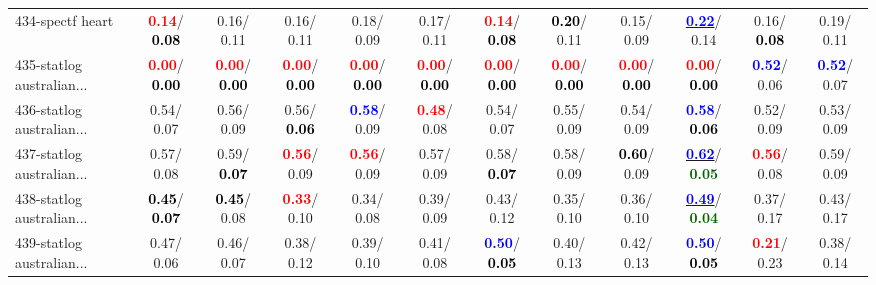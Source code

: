 \begin{table}[h]
\begin{center}
{\begin{tabular}{lc|c|c|c|c|c|c|c|c|c|c}
434-spectf heart & \textcolor{red}{\textbf{  0.14}}/\textcolor{black}{\textbf{  0.08}} &   0.16/  0.11 &   0.16/  0.11 &   0.18/  0.09 &   0.17/  0.11 & \textcolor{red}{\textbf{  0.14}}/\textcolor{black}{\textbf{  0.08}} & \textcolor{black}{\textbf{  0.20}}/  0.11 &   0.15/  0.09 & \underline{\textcolor{blue}{\textbf{  0.22}}}/  0.14 &   0.16/\textcolor{black}{\textbf{  0.08}} &   0.19/  0.11 \\
435-statlog australian... & \textcolor{red}{\textbf{  0.00}}/\textcolor{black}{\textbf{  0.00}} & \textcolor{red}{\textbf{  0.00}}/\textcolor{black}{\textbf{  0.00}} & \textcolor{red}{\textbf{  0.00}}/\textcolor{black}{\textbf{  0.00}} & \textcolor{red}{\textbf{  0.00}}/\textcolor{black}{\textbf{  0.00}} & \textcolor{red}{\textbf{  0.00}}/\textcolor{black}{\textbf{  0.00}} & \textcolor{red}{\textbf{  0.00}}/\textcolor{black}{\textbf{  0.00}} & \textcolor{red}{\textbf{  0.00}}/\textcolor{black}{\textbf{  0.00}} & \textcolor{red}{\textbf{  0.00}}/\textcolor{black}{\textbf{  0.00}} & \textcolor{red}{\textbf{  0.00}}/\textcolor{black}{\textbf{  0.00}} & \textcolor{blue}{\textbf{  0.52}}/  0.06 & \textcolor{blue}{\textbf{  0.52}}/  0.07 \\
436-statlog australian... &   0.54/  0.07 &   0.56/  0.09 &   0.56/\textcolor{black}{\textbf{  0.06}} & \textcolor{blue}{\textbf{  0.58}}/  0.09 & \textcolor{red}{\textbf{  0.48}}/  0.08 &   0.54/  0.07 &   0.55/  0.09 &   0.54/  0.09 & \textcolor{blue}{\textbf{  0.58}}/\textcolor{black}{\textbf{  0.06}} &   0.52/  0.09 &   0.53/  0.09 \\
437-statlog australian... &   0.57/  0.08 &   0.59/\textcolor{black}{\textbf{  0.07}} & \textcolor{red}{\textbf{  0.56}}/  0.09 & \textcolor{red}{\textbf{  0.56}}/  0.09 &   0.57/  0.09 &   0.58/\textcolor{black}{\textbf{  0.07}} &   0.58/  0.09 & \textcolor{black}{\textbf{  0.60}}/  0.09 & \underline{\textcolor{blue}{\textbf{  0.62}}}/\textcolor{darkgreen}{\textbf{  0.05}} & \textcolor{red}{\textbf{  0.56}}/  0.08 &   0.59/  0.09 \\ \hline
438-statlog australian... & \textcolor{black}{\textbf{  0.45}}/\textcolor{black}{\textbf{  0.07}} & \textcolor{black}{\textbf{  0.45}}/  0.08 & \textcolor{red}{\textbf{  0.33}}/  0.10 &   0.34/  0.08 &   0.39/  0.09 &   0.43/  0.12 &   0.35/  0.10 &   0.36/  0.10 & \underline{\textcolor{blue}{\textbf{  0.49}}}/\textcolor{darkgreen}{\textbf{  0.04}} &   0.37/  0.17 &   0.43/  0.17 \\
439-statlog australian... &   0.47/  0.06 &   0.46/  0.07 &   0.38/  0.12 &   0.39/  0.10 &   0.41/  0.08 & \textcolor{blue}{\textbf{  0.50}}/\textcolor{black}{\textbf{  0.05}} &   0.40/  0.13 &   0.42/  0.13 & \textcolor{blue}{\textbf{  0.50}}/\textcolor{black}{\textbf{  0.05}} & \textcolor{red}{\textbf{  0.21}}/  0.23 &   0.38/  0.14 \\

\end{tabular}}
\end{center}
\end{table}
